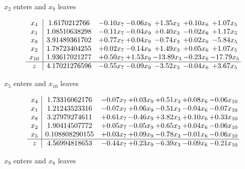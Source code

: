 \documentclass[8pt]{article}
\begin{document}
 $ x_{2} $ enters and $ x_{9} $ leaves 

 \[\begin{array}{c| c c@{\hskip 2pt} c@{\hskip 2pt} c@{\hskip 2pt} c@{\hskip 2pt} c@{\hskip 2pt} }
 x_{4}   &  1.6170212766 & -0.10 x_{7} & -0.06 x_{9} & +  1.35 x_{3} & +  0.10 x_{6} & +  1.07 x_{5}\\
 x_{1}   &  1.08510638298 & -0.11 x_{7} & -0.04 x_{9} & +  0.40 x_{3} & -0.02 x_{6} & +  1.17 x_{5}\\
 x_{8}   &  3.91489361702 & +  0.77 x_{7} & +  0.04 x_{9} & -0.74 x_{3} & +  0.02 x_{6} & -5.84 x_{5}\\
 x_{2}   &  1.78723404255 & +  0.02 x_{7} & -0.14 x_{9} & +  1.49 x_{3} & +  0.05 x_{6} & +  1.07 x_{5}\\
 x_{10}   &  1.93617021277 & +  0.50 x_{7} & +  1.53 x_{9} & -13.89 x_{3} & -0.23 x_{6} & -17.79 x_{5}\\
\hline
z    &  4.17021276596 & -0.55 x_{7} & -0.09 x_{9} & -3.52 x_{3} & -0.04 x_{6} & +  3.67 x_{5}\\
\end{array}\]


 $ x_{5} $ enters and $ x_{10} $ leaves 

 \[\begin{array}{c| c c@{\hskip 2pt} c@{\hskip 2pt} c@{\hskip 2pt} c@{\hskip 2pt} c@{\hskip 2pt} }
 x_{4}   &  1.73316062176 & -0.07 x_{7} & +  0.03 x_{9} & +  0.51 x_{3} & +  0.08 x_{6} & -0.06 x_{10}\\
 x_{1}   &  1.21243523316 & -0.07 x_{7} & +  0.06 x_{9} & -0.51 x_{3} & -0.04 x_{6} & -0.07 x_{10}\\
 x_{8}   &  3.27979274611 & +  0.61 x_{7} & -0.46 x_{9} & +  3.82 x_{3} & +  0.10 x_{6} & +  0.33 x_{10}\\
 x_{2}   &  1.90414507772 & +  0.05 x_{7} & -0.05 x_{9} & +  0.65 x_{3} & +  0.04 x_{6} & -0.06 x_{10}\\
 x_{5}   &  0.108808290155 & +  0.03 x_{7} & +  0.09 x_{9} & -0.78 x_{3} & -0.01 x_{6} & -0.06 x_{10}\\
\hline
z    &  4.56994818653 & -0.44 x_{7} & +  0.23 x_{9} & -6.39 x_{3} & -0.09 x_{6} & -0.21 x_{10}\\
\end{array}\]


 $ x_{9} $ enters and $ x_{8} $ leaves 
\end{document}
